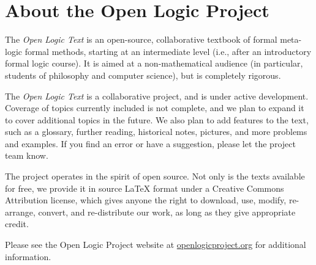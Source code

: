 \chapter*{About the Open Logic Project}

The \textit{Open Logic Text} is an open-source, collaborative textbook
of formal meta-logic formal methods, starting at an intermediate level
(i.e., after an introductory formal logic course). It is aimed at a
non-mathematical audience (in particular, students of philosophy and
computer science), but is completely rigorous.

The \textit{Open Logic Text} is a collaborative project, and is under
active development.  Coverage of topics currently included is not
complete, and we plan to expand it to cover additional topics in the
future. We also plan to add features to the text, such as a glossary,
further reading, historical notes, pictures, and more problems and
examples.  If you find an error or have a suggestion, please let the
project team know.

The project operates in the spirit of open source. Not only is the
texts available for free, we provide it in source LaTeX format under a
Creative Commons Attribution license, which gives anyone the right to
download, use, modify, re-arrange, convert, and re-distribute our
work, as long as they give appropriate credit.

Please see the Open Logic Project website at
\href{http://openlogicproject.org/}{openlogicproject.org} for
additional information.
